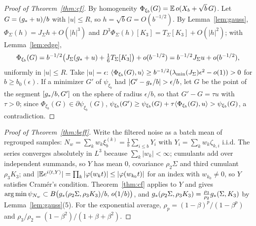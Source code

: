 \begin{proof}[Proof of Theorem~\ref{thm:cf}]
By homogeneity $\Phi_{\xi_b}(G)=\mathbb{E}\,o(X_b+\sqrt b\,G)$. Let $G=(g_\ast+u)/b$ with $|u|\le R$, so $h=\sqrt bG=O(b^{-1/2})$.
By Lemma~\ref{lem:gauss}, $\Phi_\Sigma(h)=J_\Sigma h+O(|h|^3)$ and $D^3\Phi_\Sigma(h)[K_3]=T_\Sigma[K_3]+O(|h|^2)$; with
Lemma~\ref{lem:edge},
\[
\Phi_{\xi_b}(G)=b^{-1/2}\big(J_\Sigma(g_\ast+u)+\tfrac16T_\Sigma[K_3]\big)+o(b^{-1/2})=b^{-1/2}J_\Sigma u+o(b^{-1/2}),
\]
uniformly in $|u|\le R$. Take $|u|=\epsilon$: $\langle \Phi_{\xi_b}(G), u\rangle\ge b^{-1/2}(\lambda_{\min}(J_\Sigma)\epsilon^2-o(1))>0$
for $b\ge b_0(\epsilon)$. If a minimizer $G'$ of $\psi_{\xi_b}$ had $|G'-\gs/b|>\epsilon/b$, let $G$ be the point of the
segment $[g_\ast/b,G']$ on the sphere of radius $\epsilon/b$, so that $G'-G=\tau u$ with $\tau>0$; since
$\Phi_{\xi_b}(G)\in\partial\psi_{\xi_b}(G)$, $\psi_{\xi_b}(G')\ge\psi_{\xi_b}(G)+\tau\langle \Phi_{\xi_b}(G), u\rangle>\psi_{\xi_b}(G)$,
a contradiction.
\end{proof}

\begin{proof}[Proof of Theorem~\ref{thm:beff}]
Write the filtered noise as a batch mean of regrouped samples:
$N_w=\sum_kw_k\xi_b^{(k)}=\frac1b\sum_{i\le b}Y_i$ with $Y_i=\sum_kw_k\zeta_{k,i}$ i.i.d. The series converges absolutely in
$L^3$ because $\sum_k|w_k|<\infty$; cumulants add over independent summands, so $Y$ has mean $0$, covariance
$\rho_2\Sigma$ and third cumulant $\rho_3K_3$; and $|\mathbb{E} e^{i\langle t, Y\rangle}|=\prod_k|\varphi(w_kt)|\le|\varphi(w_{k_0}t)|$ for an
index with $w_{k_0}\ne0$, so $Y$ satisfies Cram\'er's condition. Theorem~\ref{thm:cf} applies to $Y$ and gives
$\arg\min\psi_{N_w}\subset B\big(g_\ast(\rho_2\Sigma,\rho_3K_3)/b,\,o(1/b)\big)$, and
$g_\ast(\rho_2\Sigma,\rho_3K_3)=\frac{\rho_3}{\rho_2}g_\ast(\Sigma,K_3)$ by Lemma~\ref{lem:gauss}(5). For the exponential
average, $\rho_p=(1-\beta)^p/(1-\beta^p)$ and $\rho_3/\rho_2=(1-\beta^2)/(1+\beta+\beta^2)$.
\end{proof}
